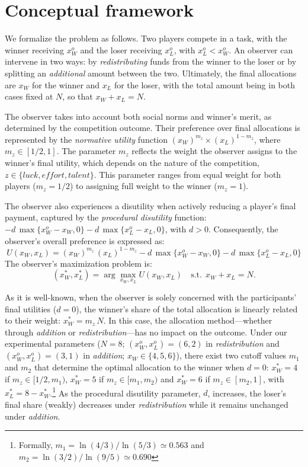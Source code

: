 \documentclass[11pt]{article}
\begin{document}
 
\section{Conceptual framework \label{sec-model} }

We formalize the problem as follows. Two players compete in a task, with the winner receiving $x^o_W$ and the loser receiving  $x^o_L$, with $x^o_L<x^o_W$. An observer can intervene in two ways: by \emph{redistributing} funds from the winner to the loser or by splitting an \emph{additional} amount between the two. Ultimately, the final allocations are $x_W$ for the winner and $x_L$ for the loser, with the total amount being in both cases fixed at $N$, so that $x_W+x_L=N$. 

The observer takes into account both social norms and winner's merit, as determined by the competition outcome. Their preference over final allocations is represented by the \emph{normative utility\/} function $\left(x_W\right)^{m_z}\times\left(x_L\right)^{1-m_z}$, where $m_z\in[1/2,1]$. The parameter $m_z$ reflects the weight the observer assigns to the winner’s final utility, which depends on the nature of the competition, $z \in\{\mathit{luck}, \mathit{effort}, \mathit{talent}\}$. This parameter ranges from equal weight for both players ($m_z=1/2$) to assigning full weight to the winner ($m_z=1$). 

The observer also experiences a disutility when actively reducing a player's final payment, captured by the \emph{procedural disutility} function: $-d\,\max\{x^o_W-x_W,0\}-d\,\max\{x^o_L-x_L,0\}$, with $d>0$. 
Consequently, the observer's overall preference is expressed as:
\[
U(x_W,x_L) = \left(x_W\right)^{m_z}\,\left(x_L\right)^{1-m_z}-d\,\max\{x^o_W-x_W,0\}-d\,\max\{x^o_L-x_L,0\}
\]
The observer's maximization problem is: 
\[
(x^*_W,x^*_L) = \arg\max_{x_W,x_L} U(x_W,x_L) \quad \textrm{s.t.} \ \ x_W+x_L = N.
\]

As it is well-known, when the observer is solely concerned with the participants' final utilities ($d=0$), the winner's share of the total allocation is linearly related to their weight: $x^*_W=m_z\,N$. In this case, the allocation method—whether through \emph{addition} or \emph{redistribution}—has no impact on the outcome. Under our experimental parameters ($N=8$; $(x^o_W,x^o_L)=(6,2)$ in \emph{redistribution} and $(x^o_W,x^o_L)=(3,1)$ in \emph{addition}; $x_W\in\{4,5,6\}$), there exist two cutoff values $m_1$ and $m_2$ that determine the optimal allocation to the winner when $d=0$: $x_W^*=4$ if $m_z\in[1/2,m_1)$, $x_W^*=5$ if $m_z\in[m_1,m_2)$ and $x_W^*=6$ if $m_z\in[m_2,1]$, with $x_L^*=8-x_W^*$.\footnote{Formally, $m_1=\ln(4/3)/\ln(5/3) \simeq 0.563$ and $m_2=\ln(3/2)/\ln(9/5) \simeq 0.690$} As the procedural disutility parameter, $d$, increases, the loser’s final share (weakly) decreases under \emph{redistribution} while it remains unchanged under \emph{addition}.
 
\end{document}
